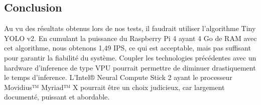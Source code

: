 \subsection{Conclusion}
\label{hwInference_Conclusion}
Au vu des résultats obtenus lors de nos tests, il faudrait utiliser l'algorithme Tiny YOLO v2. En cumulant la puissance du Raspberry Pi 4 ayant 4 Go de \gls{RAM} avec cet algorithme, 
nous obtenons 1,49 IPS, ce qui est acceptable, mais pas suffisant pour garantir la fiabilité du système.
Coupler les technologies précédentes avec un hardware d'\gls{inference} de type \gls{VPU} pourrait permettre de diminuer drastiquement le temps d'\gls{inference}.
L'Intel® Neural Compute Stick 2 \cite{Movidius} ayant le processeur Movidius™ Myriad™ X pourrait être un choix judicieux, car largement documenté, puissant et abordable.